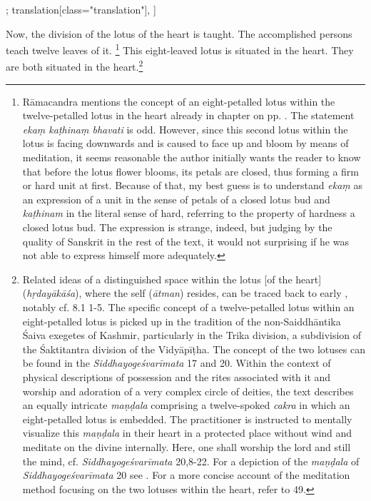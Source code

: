 \begin{alignment}[
  texts=edition[class="edition"];
  translation[class="translation"],
  ]
\begin{translation}
\begin{tlate}[p47_01]
Now, the division of the lotus of the heart is taught. The accomplished persons teach twelve leaves of it. \footnote{Rāmacandra mentions the concept of an eight-petalled lotus within the twelve-petalled lotus in the heart already in chapter  on pp. \pageref{cakra4}. The statement \textit{ekaṃ kaṭhinaṃ bhavati} is odd. However, since this second lotus within the lotus is facing downwards and is caused to face up and bloom by means of meditation, it seems reasonable the author initially wants the reader to know that before the lotus flower blooms, its petals are closed, thus forming a firm or hard unit at first. Because of that, my best guess is to understand \textit{ekaṃ} as an expression of a unit in the sense of petals of a closed lotus bud and \textit{kaṭhinam} in the literal sense of hard, referring to the property of hardness a closed lotus bud. The expression is strange, indeed, but judging by the quality of Sanskrit in the rest of the text, it would not surprising if he was not able to express himself more adequately.} This eight-leaved lotus is situated in the heart. They are both situated in the heart.\footnote{Related ideas of a distinguished space within the lotus [of the heart] (\textit{hṛdayākāśa}), where the self (\textit{ātman}) resides, can be traced back to early , notably cf.  8.1 1-5. The specific concept of a twelve-petalled lotus within an eight-petalled lotus is picked up in the tradition of the non-Saiddhāntika Śaiva exegetes of Kashmir, particularly in the Trika division, a subdivision of the Śaktitantra division of the Vidyāpīṭha. The concept of the two lotuses can be found in the \textit{Siddhayogeśvarīmata} 17 and 20. Within the context of physical descriptions of possession and the rites associated with it and worship and adoration of a very complex circle of deities, the text describes an equally intricate \textit{maṇḍala} comprising a twelve-spoked \textit{cakra} in which an eight-petalled lotus is embedded. The practitioner is instructed to mentally visualize this \textit{maṇḍala} in their heart in a protected place without wind and meditate on the divine internally. Here, one shall worship the lord and still the mind, cf. \textit{Siddhayogeśvarīmata} 20,8-22. For a depiction of the \textit{maṇḍala} of \textit{Siddhayogeśvarīmata} 20 see \citeauthor[2022:117-124]{törzsök2022}. For a more concise account of the meditation method focusing on the two lotuses within the heart, refer to  49.}


\end{tlate}
\end{translation}
\end{alignment}
